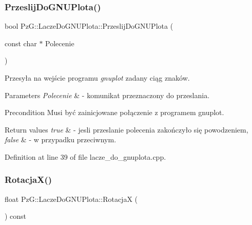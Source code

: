 \subsubsection{\texorpdfstring{Przeslij\+Do\+G\+N\+U\+Plota()}{PrzeslijDoGNUPlota()}}
{\footnotesize\ttfamily bool Pz\+G\+::\+Lacze\+Do\+G\+N\+U\+Plota\+::\+Przeslij\+Do\+G\+N\+U\+Plota (\begin{DoxyParamCaption}\item[{const char $\ast$}]{Polecenie }\end{DoxyParamCaption})\hspace{0.3cm}{\ttfamily [protected]}}

Przesyła na wejście programu {\itshape gnuplot} zadany ciąg znaków. 
\begin{DoxyParams}{Parameters}
{\em Polecenie} & -\/ komunikat przeznaczony do przeslania.\\
\hline
\end{DoxyParams}
\begin{DoxyPrecond}{Precondition}
Musi być zainicjowane połączenie z programem gnuplot.
\end{DoxyPrecond}

\begin{DoxyRetVals}{Return values}
{\em true} & -\/ jesli przeslanie polecenia zakończyło się powodzeniem, \\
\hline
{\em false} & -\/ w przypadku przeciwnym. \\
\hline
\end{DoxyRetVals}


Definition at line 39 of file lacze\+\_\+do\+\_\+gnuplota.\+cpp.

\mbox{\label{class_pz_g_1_1_lacze_do_g_n_u_plota_addf0b844f626f3f5220de70efcbbdbb3}} 
\subsubsection{\texorpdfstring{Rotacja\+X()}{RotacjaX()}}
{\footnotesize\ttfamily float Pz\+G\+::\+Lacze\+Do\+G\+N\+U\+Plota\+::\+RotacjaX (\begin{DoxyParamCaption}{ }\end{DoxyParamCaption}) const\hspace{0.3cm}{\ttfamily [inline]}}

